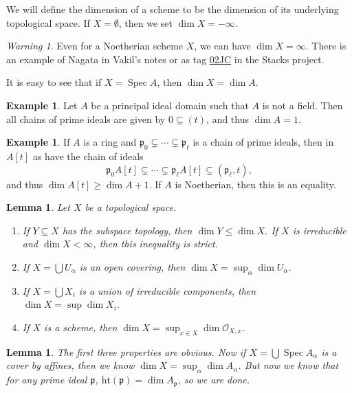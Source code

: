 \documentclass[leqno, openany]{memoir}
\newtheorem{lem}[thm]{Lemma}
\theoremstyle{definition}
\newtheorem{exm}[thm]{Example}
\theoremstyle{remark}
\newtheorem{warn}[thm]{Warning}
\theoremstyle{plain}
\theoremstyle{definition}
\theoremstyle{remark}
\newcommand{\mc}[1]{\mathcal{#1}}
\newcommand{\mf}[1]{\mathfrak{#1}}
\newcommand{\mr}[1]{\mathrm{#1}}
\DeclareMathOperator{\Spec}{Spec}
\begin{document}
We will define the dimension of a scheme to be the dimension of its underlying topological space. If $X = \emptyset$, then we set $\dim X = - \infty$. 

\begin{warn}
    Even for a Noetherian scheme $X$, we can have $\dim X = \infty$. There is an example of Nagata in Vakil's notes or as tag \href{https://stacks.math.columbia.edu/tag/02JC}{02JC} in the Stacks project.
\end{warn}

It is easy to see that if $X = \Spec A$, then $\dim X = \dim A$.

\begin{exm}
    Let $A$ be a principal ideal domain such that $A$ is not a field. Then all chains of prime ideals are given by $0 \subseteq (t)$, and thus $\dim A = 1$.
\end{exm}

\begin{exm}
    If $A$ is a ring and $\mf{p}_0 \subsetneq \cdots \subsetneq \mf{p}_{\ell}$ is a chain of prime ideals, then in $A[t]$ as have the chain of ideals
    \[ \mf{p}_0 A[t] \subsetneq \cdots \subsetneq \mf{p}_{\ell} A[t] \subsetneq (\mf{p}_{\ell}, t), \]
    and thus $\dim A[t] \geq \dim A + 1$. If $A$ is Noetherian, then this is an equality.
\end{exm}

\begin{lem}
    Let $X$ be a topological space.
    \begin{enumerate}
        \item If $Y \subseteq X$ has the subspace topology, then $\dim Y \leq \dim X$. If $X$ is irreducible and $\dim X < \infty$, then this inequality is strict.
        \item If $X = \bigcup U_{\alpha}$ is an open covering, then $\dim X = \sup_{\alpha} \dim U_{\alpha}$.
        \item If $X = \bigcup X_i$ is a union of irreducible components, then $\dim X = \sup \dim X_i$.
        \item If $X$ is a scheme, then $\dim X = \sup_{x \in X} \dim \mc{O}_{X,x}$.
    \end{enumerate}
\end{lem}

\begin{lem}
    The first three properties are obvious. Now if $X = \bigcup \Spec A_{\alpha}$ is a cover by affines, then we know $\dim X = \sup_{\alpha} \dim A_{\alpha}$. But now we know that for any prime ideal $\mf{p}$, $\mr{ht}(\mf{p}) = \dim A_{\mf{p}}$, so we are done.
\end{lem}
\end{document}
